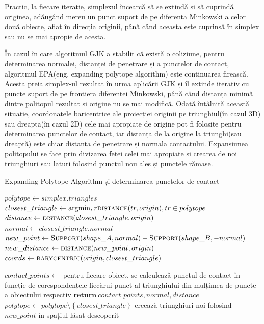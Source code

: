 \documentclass[12pt,a4paper]{report}
\DeclareMathOperator*{\argmin}{\arg\!\min}
\begin{document}
Practic, la fiecare iterație, simplexul încearcă să se extindă și să cuprindă originea, adăugând mereu un punct suport de pe diferența Minkowski a celor două obiecte, aflat în direcția originii, până când aceasta este cuprinsă în simplex sau nu se mai apropie de acesta.


În cazul în care algoritmul GJK a stabilit că există o coliziune, pentru determinarea normalei, distanței de penetrare și a punctelor de contact, algoritmul EPA\cite{epa_gino}(eng. expanding polytope algorithm) este continuarea firească. Acesta preia simplex-ul rezultat în urma aplicării GJK și îl extinde iterativ cu puncte suport de pe frontiera diferenței Minkowski, până când distanța minimă dintre politopul rezultat și origine nu se mai modifică. Odată întâlnită această situație, coordonatele baricentrice ale proiecției originii pe triunghiul(în cazul 3D) sau dreapta(în cazul 2D) cele mai apropiate de origine pot fi folosite pentru determinarea punctelor de contact, iar distanța de la origine la triunghi(sau dreaptă) este chiar distanța de penetrare și normala contactului. Expansiunea politopului se face prin divizarea feței celei mai apropiate și crearea de noi triunghiuri sau laturi folosind punctul nou ales și punctele rămase.

\begin{algorithm}[H]
	\footnotesize
	\linespread{1.0}\selectfont
	\caption{Expanding Polytope Algorithm și determinarea punctelor de contact}
	\label{epa}
	\begin{algorithmic}[0]
			\State $ polytope \gets simplex.triangles $
			\Loop
				\State $ closest\_triangle \gets \argmin_tr \textproc{distance}(tr, origin), tr \in polytope $
				\State $ distance \gets \textproc{distance}(closest\_triangle, origin) $
				\State $ normal \gets closest\_triangle.normal $
				\State $ new\_point \gets \textproc{Support}(shape\_A, normal) - \textproc{Support}(shape\_B, -normal) $
				\State $ new\_distance \gets \textproc{distance}(new\_point, origin) $
					\State $ coords \gets \textproc{barycentric}(origin, closest\_triangle) $
					
				\State	$ contact\_points \gets $ pentru fiecare obiect, se calculează punctul de contact în funcție de corespondențele fiecărui punct al triunghiului din mulțimea de puncte a obiectului respectiv
				\State $ \textbf{return}\ contact\_points, normal, distance $
				\EndIf
				\State $ polytope \gets polytope \setminus \left\lbrace closest\_triangle \right\rbrace $
				\State creează triunghiuri noi folosind $ new\_point $ în spațiul lăsat descoperit
			\EndLoop
		\EndFunction
	\end{algorithmic}
\end{algorithm}
\end{document}

